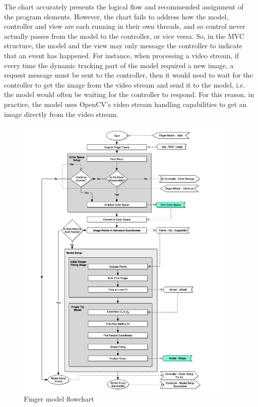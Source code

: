 The chart accurately presents the logical flow and recommended assignment of the program elements. However, the chart fails to address how the model, controller and view are each running in their own threads, and so control never actually passes from the model to the controller, or vice versa. So, in the MVC structure, the model and the view may only message the controller to indicate that an event has happened. For instance, when processing a video stream, if every time the dynamic tracking part of the model required a new image, a request message must be sent to the controller, then it would need to wait for the controller to get the image from the video stream and send it to the model, i.e. the model would often be waiting for the controller to respond. For this reason, in practice, the model uses OpenCV's video stream handling capabilities to get an image directly from the video stream.

\begin{figure}[h!]
  \centering
    \includegraphics[width=0.95\textwidth]{Chapter4/Figs/Fingerpress_Finger_Model.jpg}
    \caption{Finger model flowchart}\label{fig:FingerpressFingerModel}
\end{figure}

